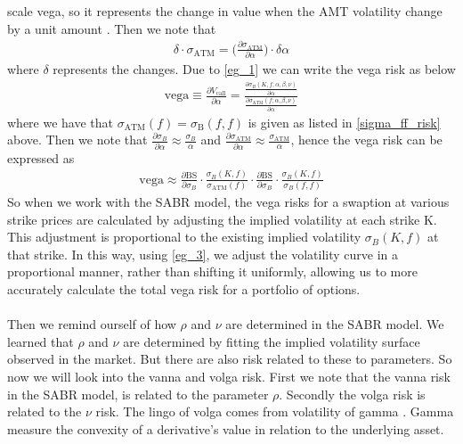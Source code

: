 scale vega, so it represents the change in value when the AMT volatility change by a unit amount \cite{Smile}.
Then we note that 
\begin{align}
    \delta  \cdot \sigma_{\text{ATM}} =
     \Big(\frac{\partial \sigma_{\text{ATM}}}{\partial \alpha} \Big) \cdot \delta \alpha \label{eg_1}
\end{align}
where $\delta$ represents the changes. Due to \autoref{eg_1} we can write the vega risk as below
\begin{align}
    \text{vega} \equiv  \frac{\partial V_{\text{call}}}{\partial \alpha} 
   = \frac{\frac{\partial \sigma_B(K, f; \alpha, \beta, \nu)}{\partial \alpha}}
    {\frac{\partial \sigma_{\text{ATM}}(f; \alpha, \beta, \nu)}{\partial \alpha}} \label{eg_3}
\end{align}
 where we have that $\sigma_{\text{ATM}}(f) = \sigma_{\text{B}} (f,f)$  is given as listed in \autoref{sigma_ff_risk}
 above. 
Then we note that  $\frac{\partial \sigma_B}{\partial \alpha} \approx \frac{ \sigma_B}{ \alpha}$ 
and $\frac{\partial \sigma_{\text{ATM}}}{\partial \alpha} \approx \frac{ \sigma_{\text{ATM}}}{\alpha}$,
hence the vega risk can be expressed as 
\begin{align}
\text{vega} \approx \frac{\partial \text{BS}}{\partial \sigma_B} \cdot
 \frac{\sigma_B(K,f)}{\sigma_{\text{ATM}}(f)} \cdot \frac{\partial \text{BS}}{\partial \sigma_B} 
 \cdot \frac{\sigma_B(K,f)}{\sigma_B(f,f)}
\end{align}
So when we work with the SABR model,
the vega risks for a swaption at various strike prices are calculated by adjusting the implied volatility at each strike 
K. This adjustment is proportional to the existing implied volatility 
$\sigma_B(K,f)$
at that strike. In this way, using \autoref{eg_3}, we adjust the
volatility curve in a proportional manner, rather than shifting 
it uniformly, allowing us to more accurately calculate the total
vega risk for a portfolio of options.
\\\\
Then we remind ourself of how $\rho$ and $\nu$ are determined in the SABR model.
We learned that $\rho$ and $\nu$ are determined by fitting the implied volatility
surface observed in the market. But there are also risk related to these 
to parameters. So now we will look into the vanna and volga risk. 
First we note that the vanna risk in the SABR model, is related 
to the  parameter $\rho$. Secondly the volga risk is related
to the $\nu$ risk. The lingo of volga comes from volatility of gamma
\cite{Smile}. Gamma measure the convexity of a derivative's value in relation to the underlying asset. 
